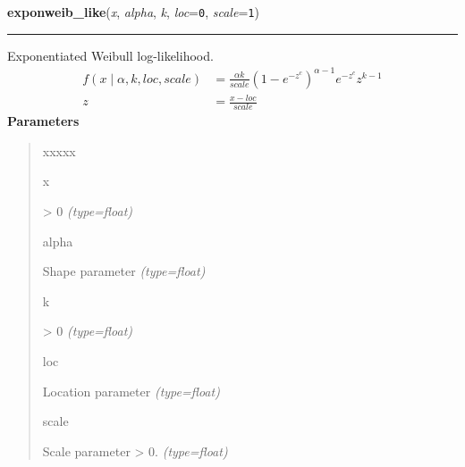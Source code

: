 \hspace{.8\funcindent}\begin{boxedminipage}{\funcwidth}

    \raggedright \textbf{exponweib\_like}(\textit{x}, \textit{alpha}, \textit{k}, \textit{loc}={\tt 0}, \textit{scale}={\tt 1})

    \vspace{-1.5ex}

    \rule{\textwidth}{0.5\fboxrule}
\setlength{\parskip}{2ex}

Exponentiated Weibull log-likelihood.
\begin{equation*}\begin{split}f(x \mid \alpha,k,loc,scale)  & = \frac{\alpha k}{scale} (1-e^{-z^c})^{\alpha-1} e^{-z^c} z^{k-1} \\z & = \frac{x-loc}{scale}\end{split}\end{equation*}\setlength{\parskip}{1ex}
      \textbf{Parameters}
      \vspace{-1ex}

      \begin{quote}
        \begin{Ventry}{xxxxx}

          \item[x]


{\textgreater} 0
            {\it (type=float)}

          \item[alpha]


Shape parameter
            {\it (type=float)}

          \item[k]


{\textgreater} 0
            {\it (type=float)}

          \item[loc]


Location parameter
            {\it (type=float)}

          \item[scale]


Scale parameter {\textgreater} 0.
            {\it (type=float)}

        \end{Ventry}

      \end{quote}

    \end{boxedminipage}

    \label{pymc:distributions:gamma_like}

